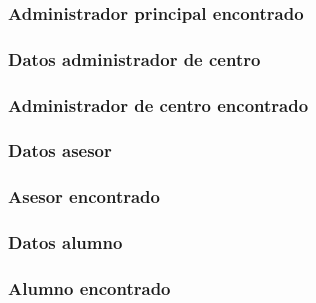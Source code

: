   

  \subsubsection{Administrador principal encontrado}

  

  \subsubsection{Datos administrador de centro}

  

  \subsubsection{Administrador de centro encontrado}

  

  \subsubsection{Datos asesor}

  

  \subsubsection{Asesor encontrado}

  

  \subsubsection{Datos alumno}

  

  \subsubsection{Alumno encontrado}

  